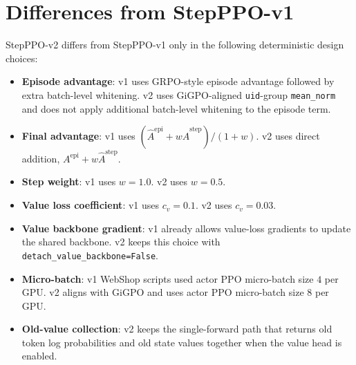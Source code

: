 \documentclass[10pt]{article}
\begin{document}
\section{Differences from StepPPO-v1}
StepPPO-v2 differs from StepPPO-v1 only in the following deterministic design choices:
\begin{itemize}
\item \textbf{Episode advantage}: v1 uses GRPO-style episode advantage followed by extra batch-level whitening. v2 uses GiGPO-aligned \texttt{uid}-group \texttt{mean\_norm} and does not apply additional batch-level whitening to the episode term.
\item \textbf{Final advantage}: v1 uses $(\widehat A^{\mathrm{epi}}+w\widehat A^{\mathrm{step}})/(1+w)$. v2 uses direct addition, $A^{\mathrm{epi}}+w\widehat A^{\mathrm{step}}$.
\item \textbf{Step weight}: v1 uses $w=1.0$. v2 uses $w=0.5$.
\item \textbf{Value loss coefficient}: v1 uses $c_v=0.1$. v2 uses $c_v=0.03$.
\item \textbf{Value backbone gradient}: v1 already allows value-loss gradients to update the shared backbone. v2 keeps this choice with \texttt{detach\_value\_backbone=False}.
\item \textbf{Micro-batch}: v1 WebShop scripts used actor PPO micro-batch size $4$ per GPU. v2 aligns with GiGPO and uses actor PPO micro-batch size $8$ per GPU.
\item \textbf{Old-value collection}: v2 keeps the single-forward path that returns old token log probabilities and old state values together when the value head is enabled.
\end{itemize}
\end{document}
